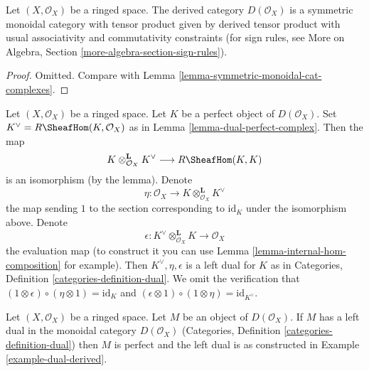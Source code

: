 \begin{lemma}
\label{lemma-symmetric-monoidal-derived}
Let $(X, \mathcal{O}_X)$ be a ringed space. The derived category
$D(\mathcal{O}_X)$ is a symmetric monoidal category with tensor product
given by derived tensor product with usual associativity and
commutativity constraints (for sign rules, see
More on Algebra, Section \ref{more-algebra-section-sign-rules}).
\end{lemma}

\begin{proof}
Omitted. Compare with Lemma \ref{lemma-symmetric-monoidal-cat-complexes}.
\end{proof}

\begin{example}
\label{example-dual-derived}
Let $(X, \mathcal{O}_X)$ be a ringed space. Let $K$ be a perfect object
of $D(\mathcal{O}_X)$. Set $K^\vee = R\SheafHom(K, \mathcal{O}_X)$
as in Lemma \ref{lemma-dual-perfect-complex}.
Then the map
$$
K \otimes_{\mathcal{O}_X}^\mathbf{L} K^\vee \longrightarrow R\SheafHom(K, K)
$$
is an isomorphism (by the lemma). Denote
$$
\eta :
\mathcal{O}_X
\longrightarrow
K \otimes_{\mathcal{O}_X}^\mathbf{L} K^\vee
$$
the map sending $1$ to the section corresponding to
$\text{id}_K$ under the isomorphism above.
Denote
$$
\epsilon : 
K^\vee
\otimes_{\mathcal{O}_X}^\mathbf{L} K
\longrightarrow
\mathcal{O}_X
$$
the evaluation map (to construct it you can use
Lemma \ref{lemma-internal-hom-composition} for example). Then
$K^\vee, \eta, \epsilon$ is a left dual for $K$ as in
Categories, Definition \ref{categories-definition-dual}.
We omit the verification that
$(1 \otimes \epsilon) \circ (\eta \otimes 1) = \text{id}_K$
and
$(\epsilon \otimes 1) \circ (1 \otimes \eta) =
\text{id}_{K^\vee}$.
\end{example}

\begin{lemma}
\label{lemma-left-dual-derived}
Let $(X, \mathcal{O}_X)$ be a ringed space. Let $M$ be an object
of $D(\mathcal{O}_X)$. If $M$ has a left dual in the monoidal category
$D(\mathcal{O}_X)$ (Categories, Definition \ref{categories-definition-dual})
then $M$ is perfect and the left dual is as constructed in
Example \ref{example-dual-derived}.
\end{lemma}

